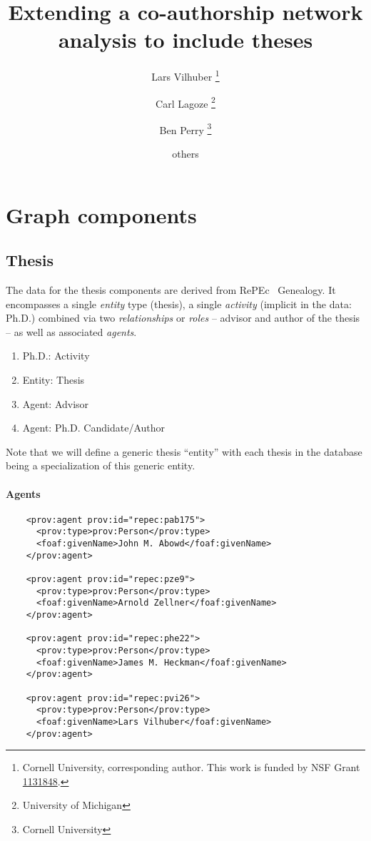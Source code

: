 \documentclass[x11names]{article}
\title{Extending a co-authorship network analysis to include theses}
\author{Lars Vilhuber%
\footnote{Cornell University, corresponding author. This work is funded by NSF Grant \href{http://www.nsf.gov/awardsearch/showAward.do?AwardNumber=1131848}{1131848}.}
\and Carl Lagoze%
\footnote{University of Michigan}
\and Ben Perry%
\footnote{Cornell University}
\and others
}
\newcommand{\repec}{RePEc}
\begin{document}
\maketitle
\providecommand{\cmark}[2][]{\relax} 
%
\section{Graph components}

\subsection{Thesis}
The data for the thesis components are derived from \repec~ Genealogy. It encompasses a single \emph{entity} type (thesis), a single \emph{activity} (implicit in the data: Ph.D.) combined via two \emph{relationships} or \emph{roles} -- advisor and author of the thesis -- as well as associated \emph{agents}.
\begin{enumerate}
\item Ph.D.: Activity
\item Entity: Thesis
\item Agent: Advisor
\item Agent: Ph.D. Candidate/Author
\end{enumerate}
Note that we will define a generic thesis ``entity'' with each thesis in the database being a specialization of this generic entity. 
\paragraph{Agents}
\lstset{language=XML,breaklines=true}
\begin{lstlisting}
    <prov:agent prov:id="repec:pab175">
      <prov:type>prov:Person</prov:type>
      <foaf:givenName>John M. Abowd</foaf:givenName>
    </prov:agent>

    <prov:agent prov:id="repec:pze9">
      <prov:type>prov:Person</prov:type>
      <foaf:givenName>Arnold Zellner</foaf:givenName>
    </prov:agent>

    <prov:agent prov:id="repec:phe22">
      <prov:type>prov:Person</prov:type>
      <foaf:givenName>James M. Heckman</foaf:givenName>
    </prov:agent>

    <prov:agent prov:id="repec:pvi26">
      <prov:type>prov:Person</prov:type>
      <foaf:givenName>Lars Vilhuber</foaf:givenName>
    </prov:agent>
\end{lstlisting}
\end{document}
